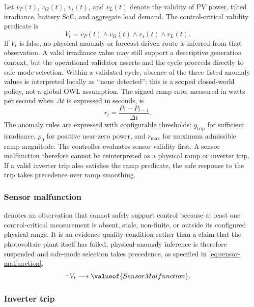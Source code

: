 Let $v_P(t)$, $v_G(t)$, $v_s(t)$, and $v_L(t)$ denote the validity of PV power, tilted irradiance, battery SoC, and aggregate load demand. The control-critical validity predicate is
\begin{equation}
\label{eq:validity}
V_t=v_P(t)\wedge v_G(t)\wedge v_s(t)\wedge v_L(t).
\end{equation}
If $V_t$ is false, no physical anomaly or forecast-driven route is inferred from that observation. A valid irradiance value may still support a descriptive generation context, but the operational validator asserts  and the cycle proceeds directly to safe-mode selection. Within a validated cycle, absence of the three listed anomaly values is interpreted locally as ``none detected''; this is a scoped closed-world policy, not a global OWL assumption.
The signed ramp rate, measured in watts per second when $\Delta t$ is expressed in seconds, is
\begin{equation}
\label{eq:signed-ramp}
r_t=\frac{P_t-P_{t-1}}{\Delta t}.
\end{equation}
The anomaly rules are expressed with configurable thresholds: $g_{\mathrm{trip}}$ for sufficient irradiance, $p_0$ for positive near-zero power, and $r_{\max}$ for maximum admissible ramp magnitude.
The controller evaluates sensor validity first. A sensor malfunction therefore cannot be reinterpreted as a physical ramp or inverter trip. If a valid inverter trip also satisfies the ramp predicate, the safe response to the trip takes precedence over ramp smoothing.

\subsubsection{Sensor malfunction}

 denotes an observation that cannot safely support control because at least one control-critical measurement is absent, stale, non-finite, or outside its configured physical range. It is an evidence-quality condition rather than a claim that the photovoltaic plant itself has failed; physical-anomaly inference is therefore suspended and safe-mode selection takes precedence, as specified in \autoref{eq:sensor-malfunction}.
\begin{equation}
\neg V_t \longrightarrow \valueof{SensorMalfunction}.
\label{eq:sensor-malfunction}
\end{equation}

\subsubsection{Inverter trip}

